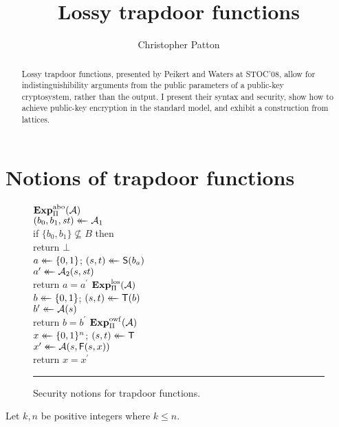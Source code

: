 \documentclass{llncs}
\begin{document}
\title{Lossy trapdoor functions}
%
%
\author{Christopher Patton}
%
%
%

\maketitle              %

\begin{abstract}
  Lossy trapdoor functions, presented by Peikert and Waters at STOC'08, allow
  for indistinguishibility arguments from the public parameters of a public-key
  cryptosystem, rather than the output.
  I present their syntax and security, show how to achieve \indcca public-key
  encryption in the standard model, and exhibit a construction from lattices.
\end{abstract}
%


\section{Notions of trapdoor functions}
\begin{figure}[t]
  {
    \underline{$\Exp{\abo}_{\tdfscheme}(\advA)$}\\[2pt]
      $(b_0, b_1, \mathit{st}) \mathrel{\leftarrow\mkern-14mu\leftarrow} \mathcal{A}_1$\\
      if $\{b_0, b_1\} \not\subseteq B$ then\\
      \tab return $\bot$\\
      $a \mathrel{\leftarrow\mkern-14mu\leftarrow} \{0,1\}$;
      $(s, t) \mathrel{\leftarrow\mkern-14mu\leftarrow} \mathsf{S}(b_a)$\\
      $a^\prime \mathrel{\leftarrow\mkern-14mu\leftarrow} \mathcal{A}_2(s, \mathit{st})$\\
      return $a=a^\prime$
  }
  {
    \underline{$\Exp{\los}_{\tdfscheme}(\advA)$}\\[2pt]
      $b \mathrel{\leftarrow\mkern-14mu\leftarrow} \{0,1\}$;
      $(s, t) \mathrel{\leftarrow\mkern-14mu\leftarrow} \mathsf{T}(b)$\\
      $b^\prime \mathrel{\leftarrow\mkern-14mu\leftarrow} \mathcal{A}(s)$\\
      return $b=b^\prime$
  }
  {
    \underline{$\Exp{\owf}_{\tdfscheme}(\advA)$}\\[2pt]
      $x \mathrel{\leftarrow\mkern-14mu\leftarrow} \{0,1\}^n$;
      $(s, t) \mathrel{\leftarrow\mkern-14mu\leftarrow} \mathsf{T}$\\
      $x^\prime \mathrel{\leftarrow\mkern-14mu\leftarrow} \mathcal{A}(s, \mathsf{F}(s, x))$\\
      return $x=x^\prime$
  }
  \caption{Security notions for trapdoor functions.}
  \label{fig-notions}
  \vspace{6pt}
  \hrule
\end{figure}
%
Let $k,n$ be positive integers where $k \leq n$.
\end{document}
